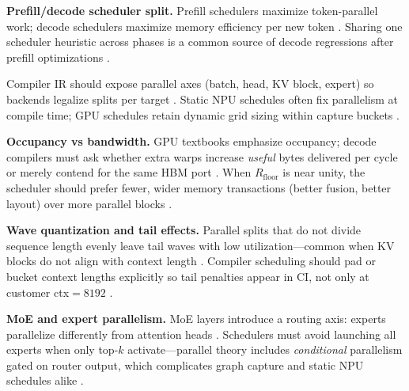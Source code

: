 \textbf{Prefill/decode scheduler split.} Prefill schedulers maximize token-parallel work; decode schedulers maximize memory efficiency per new token \citep{patel2025llminference,dao2022flashattention,dao2023flashdecoding,kwon2023vllm,taxbreak2026,memoryfloor2026,yirage2026,chen2020compilerbasedhardw,dlbook,amd2024xdna,amd2024aie,semianalysis2024tma,liu2024deepseekv3,nvidia2022hopper,nvidia2024cudagraphs,dao2023flashdecoding}. Sharing one scheduler heuristic across phases is a common source of decode regressions after prefill optimizations \citep{patel2025llminference,memoryfloor2026,taxbreak2026,yirage2026,chen2020compilerbasedhardw,dlbook}.

Compiler IR should expose parallel axes (batch, head, KV block, expert) so backends legalize splits per target \citep{yirage2026,chen2020compilerbasedhardw,liu2024deepseekv3,amd2024aie,amd2024xdna,nvidia2022hopper,semianalysis2024tma,patel2025llminference,taxbreak2026,memoryfloor2026,kwon2023vllm,dlbook,dao2022flashattention,dao2023flashdecoding,nvidia2024cudagraphs}. Static NPU schedules often fix parallelism at compile time; GPU schedules retain dynamic grid sizing within capture buckets \citep{amd2024xdna,nvidia2024cudagraphs,chen2020compilerbasedhardw,yirage2026,patel2025llminference,taxbreak2026,memoryfloor2026,semianalysis2024tma,dlbook,kwon2023vllm,liu2024deepseekv3,dao2022flashattention,dao2023flashdecoding,nvidia2022hopper,amd2024aie}.

\textbf{Occupancy vs bandwidth.} GPU textbooks emphasize occupancy; decode compilers must ask whether extra warps increase \emph{useful} bytes delivered per cycle or merely contend for the same HBM port \citep{memoryfloor2026,semianalysis2024tma,patel2025llminference,taxbreak2026}. When $R_{\mathrm{floor}}$ is near unity, the scheduler should prefer fewer, wider memory transactions (better fusion, better layout) over more parallel blocks \citep{memoryfloor2026,dao2022flashattention,yirage2026}.

\textbf{Wave quantization and tail effects.} Parallel splits that do not divide sequence length evenly leave tail waves with low utilization---common when KV blocks do not align with context length \citep{dao2023flashdecoding,kwon2023vllm,patel2025llminference}. Compiler scheduling should pad or bucket context lengths explicitly so tail penalties appear in CI, not only at customer ctx${=}8192$ \citep{memoryfloor2026,taxbreak2026,yirage2026,chen2020compilerbasedhardw}.

\textbf{MoE and expert parallelism.} MoE layers introduce a routing axis: experts parallelize differently from attention heads \citep{liu2024deepseekv3,taxbreak2026,kwon2023vllm}. Schedulers must avoid launching all experts when only top-$k$ activate---parallel theory includes \emph{conditional} parallelism gated on router output, which complicates graph capture and static NPU schedules alike \citep{taxbreak2026,nvidia2024cudagraphs,amd2024aie,yirage2026,chen2020compilerbasedhardw,patel2025llminference}.

